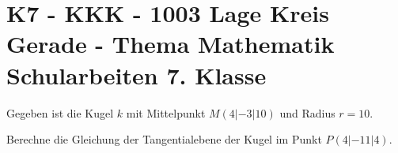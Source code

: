 \section{K7 - KKK - 1003 Lage Kreis Gerade - Thema Mathematik Schularbeiten 7. Klasse}

\begin{beispiel}[K7 - KKK]{1} %
			 Gegeben ist die Kugel $k$ mit Mittelpunkt $M(4|-3|10)$ und Radius $r=10$.
			
			Berechne die Gleichung der Tangentialebene der Kugel im Punkt $P(4|-11|4)$.
			
			\end{beispiel}